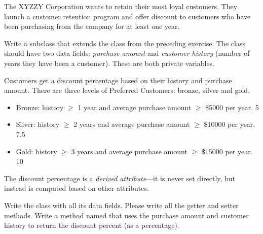 \begin{exercise}
The XYZZY Corporation wants to retain their most loyal customers. They launch a customer retention program and offer discount to customers who have been purchasing from the company for at least one year.

Write a subclass  that extends the  class from the preceding exercise. The  class should have two data fields: {\em purchase amount} and {\em customer history} (number of years they have been a customer). These are both private variables.

Customers get a discount percentage based on their history and purchase amount. There are three levels of Preferred Customers: bronze, silver and gold.

\begin{itemize}
\item Bronze: history $\geq$ 1 year and average purchase amount $\geq$ \$5000 per year.  5%
\item Silver:  history $\geq$ 2 years and average purchase amount $\geq$ \$10000 per year. 7.5%
\item Gold:  history $\geq$ 3 years and average purchase amount $\geq$ \$15000 per year. 10%
\end{itemize}

The discount percentage is a {\em derived attribute}---it is never set directly, but instead is computed based on other attributes.

Write the  class with all its data fields. Please write all the getter and setter methods.  Write a method named  that uses the purchase amount and customer history to return the discount percent (as a percentage).
\end{exercise}


